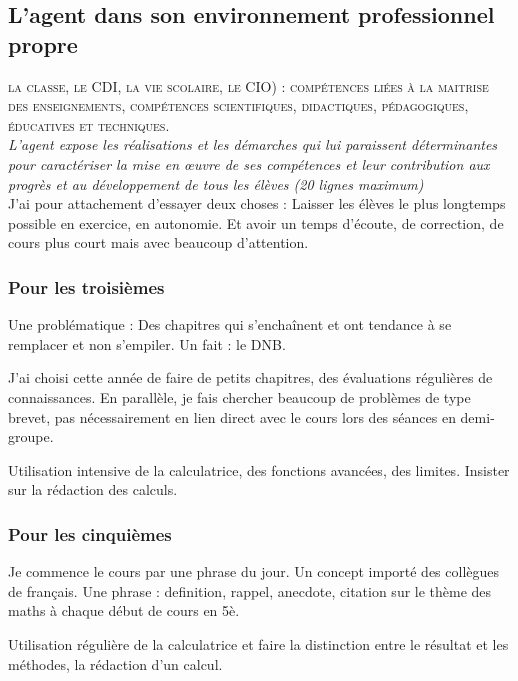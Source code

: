 \documentclass[11pt]{article}
\begin{document}
\subsection{L’agent dans son environnement professionnel propre}

\textsc{la classe, le CDI, la vie scolaire, le CIO) : compétences liées à la maitrise des enseignements, compétences scientifiques, didactiques, pédagogiques, éducatives et techniques.}\\

\textit{L’agent expose les réalisations et les démarches qui lui paraissent déterminantes pour caractériser la mise en œuvre de ses compétences et leur contribution aux progrès et au développement de tous les élèves (20 lignes maximum)}\\

J'ai pour attachement d'essayer deux choses : Laisser les élèves le plus longtemps possible en exercice, en autonomie. Et avoir un temps d'écoute, de correction, de cours plus court mais avec beaucoup d'attention.


\subsubsection{Pour les troisièmes}

Une problématique : Des chapitres qui s'enchaînent et ont tendance à se remplacer et non s'empiler. Un fait : le DNB. 

J'ai choisi cette année de faire de petits chapitres, des évaluations régulières de connaissances. En parallèle, je fais chercher beaucoup de problèmes de type brevet, pas nécessairement en lien direct avec le cours lors des séances en demi-groupe. 

Utilisation intensive de la calculatrice, des fonctions avancées, des limites. Insister sur la rédaction des calculs. 

\subsubsection{Pour les cinquièmes}

Je commence le cours par une phrase du jour. Un concept importé des collègues de français. Une phrase : definition, rappel, anecdote, citation sur le thème des maths à chaque début de cours en 5è.

Utilisation régulière de la calculatrice et faire la distinction entre le résultat et les méthodes, la rédaction d'un calcul.
\end{document}
